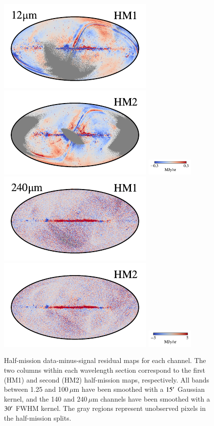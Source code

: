 \documentclass[twocolumn]{aa}
\begin{document}
\begin{figure}[t]
    \includegraphics[width=0.22\linewidth]{figs/compare_res/cosmoglobe_res_05a.pdf}%
    \includegraphics[width=0.22\linewidth]{figs/compare_res/cosmoglobe_res_05b.pdf}%
    \includegraphics[width=23mm,angle=90]{figs/compare_res/cbar_05.pdf}\hspace*{3mm}
    \includegraphics[width=0.22\linewidth]{figs/compare_res/cosmoglobe_res_10a.pdf}%
    \includegraphics[width=0.22\linewidth]{figs/compare_res/cosmoglobe_res_10b.pdf}%
    \includegraphics[width=23mm,angle=90]{figs/compare_res/cbar_10.pdf}%
    \caption{Half-mission data-minus-signal residual maps for each
      channel. The two columns within each wavelength section
      correspond to the first (HM1) and second (HM2) half-mission
      maps, respectively. All bands between 1.25 and 100$\,\mu$m have
      been smoothed with a $15\arcm$ Gaussian kernel, and the 140 and
      240\,$\mu$m channels have been smoothed with a $30\arcm$ FWHM
      kernel. The gray regions represent unobserved pixels in the
      half-mission splits.}
    \label{fig:half-mission-res2}
\end{figure}
\end{document}
